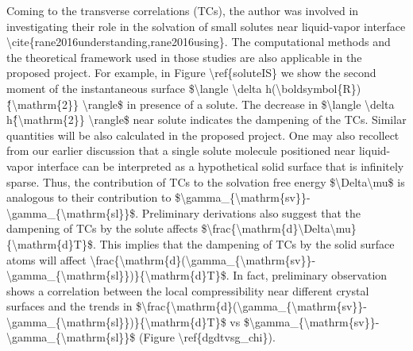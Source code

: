 \par Coming to the transverse correlations (TCs), the author was involved in investigating their role in the solvation of small solutes near liquid-vapor interface \textbackslash cite\{rane2016understanding,rane2016using\}. The computational methods and the theoretical framework used in those studies are also applicable in the proposed project. For example, in Figure \textbackslash ref\{soluteIS\} we show the second moment of the instantaneous surface \$\textbackslash langle \textbackslash delta h(\textbackslash boldsymbol\{R\})\^\{\textbackslash mathrm\{2\}\} \textbackslash rangle\$ in presence of a solute. The decrease in \$\textbackslash langle \textbackslash delta h\^\{\textbackslash mathrm\{2\}\} \textbackslash rangle\$ near solute indicates the dampening of the TCs. Similar quantities will be also calculated in the proposed project. One may also recollect from our earlier discussion that a single solute molecule positioned near liquid-vapor interface can be interpreted as a hypothetical solid surface that is infinitely sparse. Thus, the contribution of TCs to the solvation free energy \$\textbackslash Delta\textbackslash mu\$ is analogous to their contribution to \$\textbackslash gamma\_\{\textbackslash mathrm\{sv\}\}-\textbackslash gamma\_\{\textbackslash mathrm\{sl\}\}\$. Preliminary derivations also suggest that the dampening of TCs by the solute affects \$\textbackslash frac\{\textbackslash mathrm\{d\}\textbackslash Delta\textbackslash mu\}\{\textbackslash mathrm\{d\}T\}\$. This implies that the dampening of TCs by the solid surface atoms will affect \textbackslash frac\{\textbackslash mathrm\{d\}(\textbackslash gamma\_\{\textbackslash mathrm\{sv\}\}-\textbackslash gamma\_\{\textbackslash mathrm\{sl\}\})\}\{\textbackslash mathrm\{d\}T\}\$. In fact, preliminary observation shows a correlation between the local compressibility near different crystal surfaces and the trends in \$\textbackslash frac\{\textbackslash mathrm\{d\}(\textbackslash gamma\_\{\textbackslash mathrm\{sv\}\}-\textbackslash gamma\_\{\textbackslash mathrm\{sl\}\})\}\{\textbackslash mathrm\{d\}T\}\$ vs \$\textbackslash gamma\_\{\textbackslash mathrm\{sv\}\}-\textbackslash gamma\_\{\textbackslash mathrm\{sl\}\}\$  (Figure \textbackslash ref\{dgdtvsg\_chi\}).
